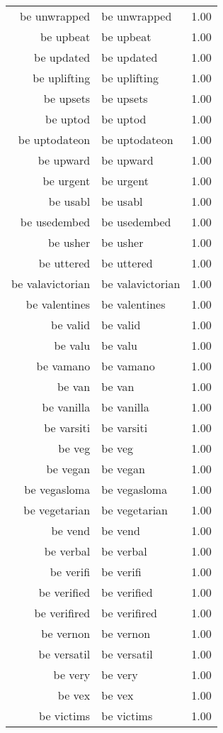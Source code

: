 \begin{table}[ht]
\begin{tabular}{rlr}
  be unwrapped & be unwrapped & 1.00 \\ 
  be upbeat & be upbeat & 1.00 \\ 
  be updated & be updated & 1.00 \\ 
  be uplifting & be uplifting & 1.00 \\ 
  be upsets & be upsets & 1.00 \\ 
  be uptod & be uptod & 1.00 \\ 
  be uptodateon & be uptodateon & 1.00 \\ 
  be upward & be upward & 1.00 \\ 
  be urgent & be urgent & 1.00 \\ 
  be usabl & be usabl & 1.00 \\ 
  be usedembed & be usedembed & 1.00 \\ 
  be usher & be usher & 1.00 \\ 
  be uttered & be uttered & 1.00 \\ 
  be valavictorian & be valavictorian & 1.00 \\ 
  be valentines & be valentines & 1.00 \\ 
  be valid & be valid & 1.00 \\ 
  be valu & be valu & 1.00 \\ 
  be vamano & be vamano & 1.00 \\ 
  be van & be van & 1.00 \\ 
  be vanilla & be vanilla & 1.00 \\ 
  be varsiti & be varsiti & 1.00 \\ 
  be veg & be veg & 1.00 \\ 
  be vegan & be vegan & 1.00 \\ 
  be vegasloma & be vegasloma & 1.00 \\ 
  be vegetarian & be vegetarian & 1.00 \\ 
  be vend & be vend & 1.00 \\ 
  be verbal & be verbal & 1.00 \\ 
  be verifi & be verifi & 1.00 \\ 
  be verified & be verified & 1.00 \\ 
  be verifired & be verifired & 1.00 \\ 
  be vernon & be vernon & 1.00 \\ 
  be versatil & be versatil & 1.00 \\ 
  be very & be very & 1.00 \\ 
  be vex & be vex & 1.00 \\ 
  be victims & be victims & 1.00 \\ 

\end{tabular}
\end{table}
